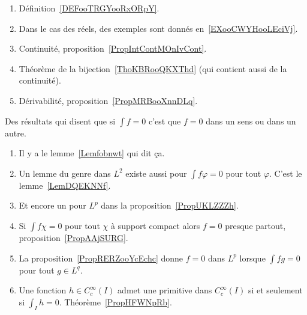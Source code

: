 \begin{enumerate}
    \item
        Définition~\ref{DEFooTRGYooRxORpY}.
    \item
        Dans le cas des réels, des exemples sont donnés en~\ref{EXooCWYHooLEciVj}.
    \item
        Continuité, proposition~\ref{PropIntContMOnIvCont}.
    \item
        Théorème de la bijection~\ref{ThoKBRooQKXThd} (qui contient aussi de la continuité).
    \item
        Dérivabilité, proposition~\ref{PropMRBooXnnDLq}.
\end{enumerate}


Des résultats qui disent que si \( \int f=0\) c'est que \( f=0\) dans un sens ou dans un autre.
\begin{enumerate}
    \item
        Il y a le lemme~\ref{Lemfobnwt} qui dit ça.
    \item
        Un lemme du genre dans \( L^2\) existe aussi pour \( \int f\varphi=0\) pour tout \( \varphi\). C'est le lemme~\ref{LemDQEKNNf}.
    \item
        Et encore un pour \( L^p\) dans la proposition~\ref{PropUKLZZZh}.
    \item
        Si \( \int f\chi=0\) pour tout \( \chi\) à support compact alors \( f=0\) presque partout, proposition~\ref{PropAAjSURG}.
    \item
        La proposition~\ref{PropRERZooYcEchc} donne \( f=0\) dans \( L^p\) lorsque \( \int fg=0\) pour tout \( g\in L^q\).
    \item
        Une fonction \( h\in C^{\infty}_c(I)\) admet une primitive dans \(  C^{\infty}_c(I)\) si et seulement si \( \int_Ih=0\). Théorème~\ref{PropHFWNpRb}.
\end{enumerate}


